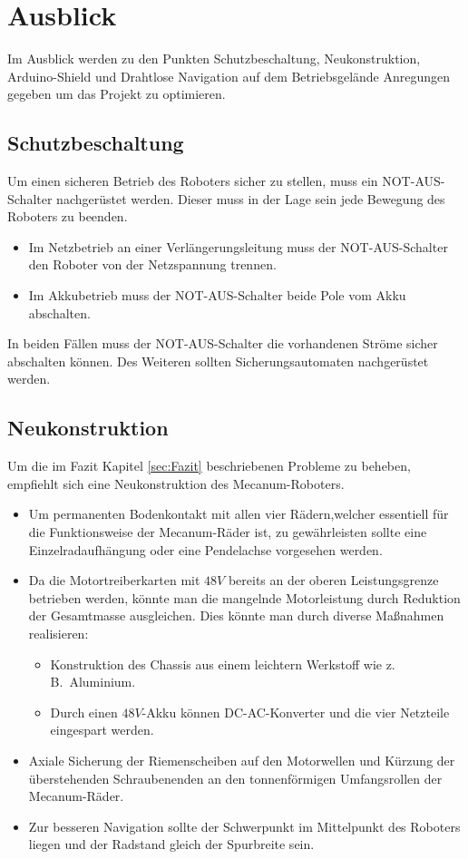 
\section{Ausblick}
\label{sec:Ausblick}
Im Ausblick werden zu den Punkten Schutzbeschaltung, Neukonstruktion, Arduino-Shield und Drahtlose Navigation auf dem Betriebsgelände Anregungen gegeben um das Projekt zu optimieren.

\subsection{Schutzbeschaltung}
\label{sec:Schutzbeschaltung}
Um einen sicheren Betrieb des Roboters sicher zu stellen, muss ein NOT-AUS-Schalter nachgerüstet werden. Dieser muss in der Lage sein jede Bewegung des Roboters zu beenden.
\begin{itemize}
\item{Im Netzbetrieb an einer Verlängerungsleitung muss der NOT-AUS-Schalter den Roboter von der Netzspannung trennen.}
\item{Im Akkubetrieb muss der NOT-AUS-Schalter beide Pole vom Akku abschalten.}
\end{itemize}
In beiden Fällen muss der NOT-AUS-Schalter die vorhandenen Ströme sicher abschalten können. Des Weiteren sollten Sicherungsautomaten nachgerüstet werden.

\subsection{Neukonstruktion}
\label{sec:Neukonstruktion}
Um die im Fazit Kapitel \ref{sec:Fazit} beschriebenen Probleme zu beheben, empfiehlt sich eine Neukonstruktion des Mecanum-Roboters.
\begin{itemize}
\item{Um permanenten Bodenkontakt mit allen vier Rädern,welcher essentiell für die Funktionsweise der Mecanum-Räder ist, zu gewährleisten sollte eine Einzelradaufhängung oder eine Pendelachse vorgesehen werden.}
\item{Da die Motortreiberkarten mit $48V$ bereits an der oberen Leistungsgrenze betrieben werden, könnte man die mangelnde Motorleistung durch Reduktion der Gesamtmasse ausgleichen. Dies könnte man durch diverse Maßnahmen realisieren:
\begin {itemize}
\item{Konstruktion des Chassis aus einem leichtern Werkstoff wie z.\,B.\ Aluminium.}
\item{Durch einen $48V$-Akku können DC-AC-Konverter und die vier Netzteile eingespart werden.}
\end{itemize}
}
\item{Axiale Sicherung der Riemenscheiben auf den Motorwellen und Kürzung der überstehenden Schraubenenden an den tonnenförmigen Umfangsrollen der Mecanum-Räder.}
\item{Zur besseren Navigation sollte der Schwerpunkt im Mittelpunkt des Roboters liegen und der Radstand gleich der Spurbreite sein.}
\end{itemize}

